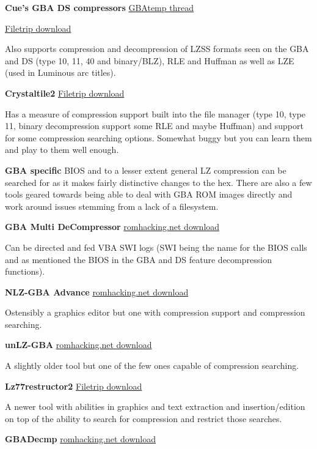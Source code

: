 \documentclass[
]{book}
\begin{document}
\textbf{Cue's GBA DS compressors} \href{http://gbatemp.net/topic/313278-nintendo-dsgba-compressors/}{GBAtemp thread}

\href{http://filetrip.net/nds-downloads/utilities/download-cues-gba-ds-compressors-10-f29010.html}{Filetrip download}

Also supports compression and decompression of LZSS formats seen on the GBA and DS (type 10, 11, 40 and binary/BLZ), RLE and Huffman as well as LZE (used in Luminous arc titles).

\textbf{Crystaltile2} \href{http://filetrip.net/f23649-CrystalTile2-2010-09-06.html}{Filetrip download}

Has a measure of compression support built into the file manager (type 10, type 11, binary decompression support some RLE and maybe Huffman) and support for some compression searching options. Somewhat buggy but you can learn them and play to them well enough.

\textbf{GBA specific} BIOS and to a lesser extent general LZ compression can be searched for as it makes fairly distinctive changes to the hex. There are also a few tools geared towards being able to deal with GBA ROM images directly and work around issues stemming from a lack of a filesystem.

\textbf{GBA Multi DeCompressor} \href{http://www.romhacking.net/utilities/431/}{romhacking.net download}

Can be directed and fed VBA SWI logs (SWI being the name for the BIOS calls and as mentioned the BIOS in the GBA and DS feature decompression functions).

\textbf{NLZ-GBA Advance} \href{http://www.romhacking.net/utilities/529/}{romhacking.net download}

Ostensibly a graphics editor but one with compression support and compression searching.

\textbf{unLZ-GBA} \href{http://www.romhacking.net/utilities/362/}{romhacking.net download}

A slightly older tool but one of the few ones capable of compression searching.

\textbf{Lz77restructor2} \href{http://filetrip.net/gba-downloads/tools-utilities/latest-lz77restructor2-f29641.html}{Filetrip download}

A newer tool with abilities in graphics and text extraction and insertion/edition on top of the ability to search for compression and restrict those searches.

\textbf{GBADecmp} \href{http://www.romhacking.net/utilities/433/}{romhacking.net download}
\end{document}
